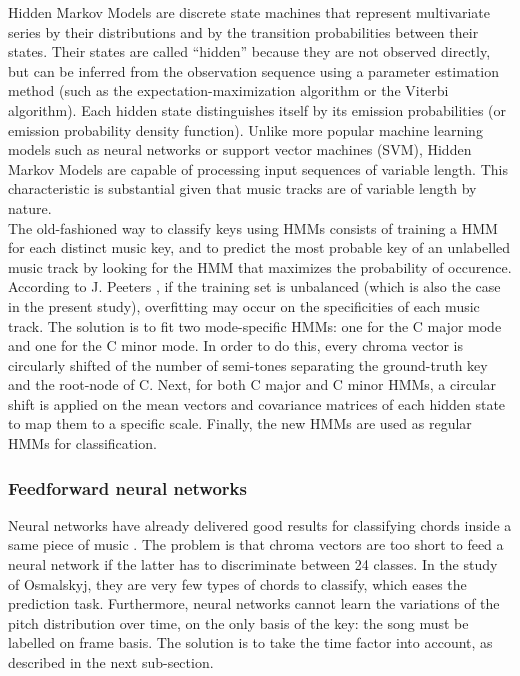 \documentclass[letterpaper]{article}
\begin{document}
Hidden Markov Models are discrete state machines that represent multivariate series by their distributions and by
the transition probabilities between their states. Their states are called “hidden” because they are not observed directly,
but can be inferred from the observation sequence using a parameter estimation method (such as the expectation-maximization algorithm
or the Viterbi algorithm). Each hidden state distinguishes itself by its emission probabilities (or emission probability density function).
Unlike more popular machine learning models such as neural networks or support vector machines (SVM), Hidden Markov Models are capable of
processing input sequences of variable length. This characteristic is substantial given that music tracks are of variable length by nature\citep{DR}. \\

The old-fashioned way to classify keys using HMMs consists of training a HMM for each distinct music key, and to predict the most probable 
key of an unlabelled music track by looking for the HMM that maximizes the probability of occurence.  \\

According to J. Peeters \citep{JP}, if the training set is unbalanced (which is also the case in the present study), overfitting may occur on the specificities
of each music track. The solution is to fit two mode-specific HMMs: one for the C major mode and one for the C minor mode. In order to do this, every chroma vector is circularly shifted of the number of semi-tones separating the ground-truth key and the root-node of C. Next, for both C major and C minor HMMs, a circular shift is applied on the mean vectors and covariance matrices of each hidden state to map them to a specific scale. Finally, the new HMMs are used as regular HMMs for classification.

\subsubsection{Feedforward neural networks}

Neural networks have already delivered good results for classifying chords inside a same piece of music \citep{JO}.
The problem is that chroma vectors are too short to feed a neural network if the latter has to discriminate between 24 classes. In the study of Osmalskyj, 
they are very few types of chords to classify, which eases the prediction task. Furthermore, neural networks cannot learn the variations of the pitch distribution over time, on the only basis of the key: the song must be labelled on frame basis. The solution is to take the time factor into account, as described in the next sub-section.
\end{document}
